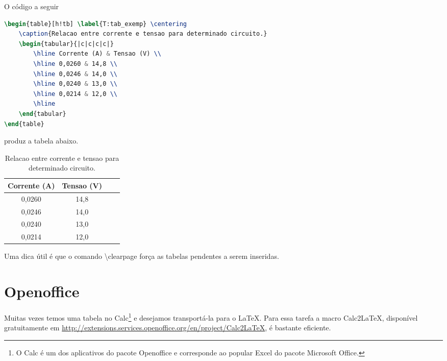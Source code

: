 O código a seguir
\begin{lstlisting}[language=TeX]
\begin{table}[h!tb] \label{T:tab_exemp} \centering
    \caption{Relacao entre corrente e tensao para determinado circuito.}
    \begin{tabular}{|c|c|c|c|}
        \hline Corrente (A) & Tensao (V) \\ 
        \hline 0,0260 & 14,8 \\
        \hline 0,0246 & 14,0 \\
        \hline 0,0240 & 13,0 \\
        \hline 0,0214 & 12,0 \\
        \hline 
    \end{tabular}
\end{table}
\end{lstlisting}
produz a tabela abaixo.
\begin{table}[h!tb] \label{T:tab_exemp} \centering
    \caption{Relacao entre corrente e tensao para determinado circuito.}
    \begin{tabular}{|c|c|c|c|}
        \hline Corrente (A) & Tensao (V) \\ 
        \hline 0,0260 & 14,8 \\
        \hline 0,0246 & 14,0 \\
        \hline 0,0240 & 13,0 \\
        \hline 0,0214 & 12,0 \\
        \hline 
    \end{tabular}
\end{table}

Uma dica útil é que o comando \textbackslash\textsf{clearpage} força as tabelas pendentes a serem inseridas.

\section{\textsf{Openoffice}}

Muitas vezes temos uma tabela no \textsf{Calc}\footnote{O Calc é um dos aplicativos do pacote \textsf{Openoffice} e corresponde ao popular \textsf{Excel} do pacote \textsf{Microsoft Office}.} e desejamos transportá-la para o LaTeX. Para essa tarefa a macro \textsf{Calc2LaTeX}, disponível gratuitamente em \url{http://extensions.services.openoffice.org/en/project/Calc2LaTeX}, é bastante eficiente.
